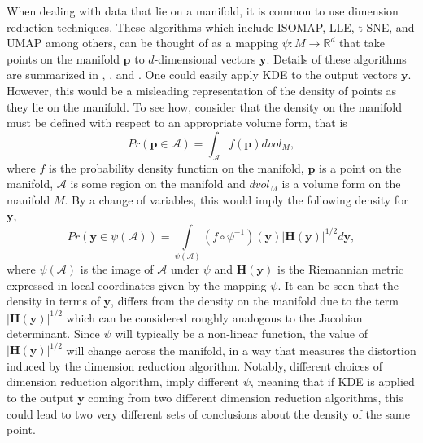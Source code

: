 \documentclass[11pt,a4paper,]{article}
\begin{document}
When dealing with data that lie on a manifold, it is common to use dimension reduction techniques. These algorithms which include ISOMAP, LLE, t-SNE, and UMAP among others, can be thought of as a mapping \(\psi:M\rightarrow \mathbb{R}^d\) that take points on the manifold \(\pmb{p}\) to \(d\)-dimensional vectors \(\pmb{y}\). Details of these algorithms are summarized in \textcite{Cayton2005-dp}, \textcite{Lee2007-wq}, \textcite{Izenman2012-mx} and \textcite{Cheng2021-dh}. One could easily apply KDE to the output vectors \(\pmb{y}\). However, this would be a misleading representation of the density of points as they lie on the manifold. To see how, consider that the density on the manifold must be defined with respect to an appropriate volume form, that is
\[Pr(\pmb{p}\in\mathcal{A})=\int_\mathcal{A} f(\pmb{p}) dvol_M,\]
where \(f\) is the probability density function on the manifold, \(\pmb{p}\) is a point on the manifold, \(\mathcal{A}\) is some region on the manifold and \(dvol_M\) is a volume form on the manifold \(M\). By a change of variables, this would imply the following density for \(\pmb{y}\),
\begin{equation}
\label{eq:changevar}
Pr(\pmb{y}\in\psi(\mathcal{A}))=\int\limits_{\psi(\mathcal{A})} (f\circ\psi^{-1})(\pmb{y})|\pmb{H}(\pmb{y})|^{1/2}d\pmb{y},
\end{equation}
where \(\psi(\mathcal{A})\) is the image of \(\mathcal{A}\) under \(\psi\) and \(\pmb{H}(\pmb{y})\) is the Riemannian metric expressed in local coordinates given by the mapping \(\psi\). It can be seen that the density in terms of \(\pmb{y}\), differs from the density on the manifold due to the term \(|\pmb{H}(\pmb{y})|^{1/2}\) which can be considered roughly analogous to the Jacobian determinant. Since \(\psi\) will typically be a non-linear function, the value of \(|\pmb{H}(\pmb{y})|^{1/2}\) will change across the manifold, in a way that measures the distortion induced by the dimension reduction algorithm. Notably, different choices of dimension reduction algorithm, imply different \(\psi\), meaning that if KDE is applied to the output \(\pmb{y}\) coming from two different dimension reduction algorithms, this could lead to two very different sets of conclusions about the density of the same point.
\end{document}
